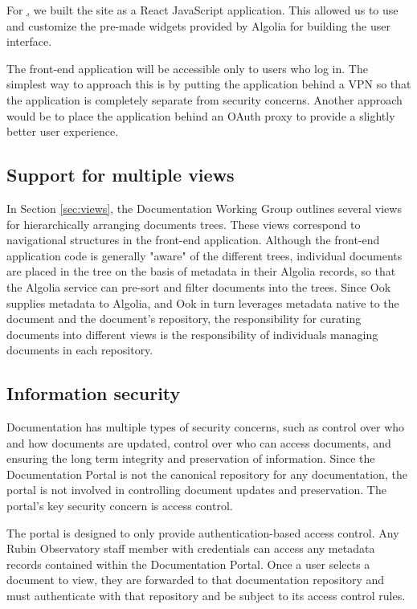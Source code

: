 For \href{www.lsst.io}, we built the site as a React JavaScript application.
This allowed us to use and customize the pre-made widgets provided by Algolia for building the user interface.

The front-end application will be accessible only to users who log in.
The simplest way to approach this is by putting the application behind a VPN so that the application is completely separate from security concerns.
Another approach would be to place the application behind an OAuth proxy to provide a slightly better user experience.

\subsection{Support for multiple views}

In Section \ref{sec:views}, the Documentation Working Group outlines several views for hierarchically arranging documents trees.
These views correspond to navigational structures in the front-end application.
Although the front-end application code is generally "aware" of the different trees, individual documents are placed in the tree on the basis of metadata in their Algolia records, so that the Algolia service can pre-sort and filter documents into the trees.
Since Ook supplies metadata to Algolia, and Ook in turn leverages metadata native to the document and the document's repository, the responsibility for curating documents into different views is the responsibility of individuals managing documents in each repository.

\subsection{Information security}

Documentation has multiple types of security concerns, such as control over who and how documents are updated, control over who can access documents, and ensuring the long term integrity and preservation of information.
Since the Documentation Portal is not the canonical repository for any documentation, the portal is not involved in controlling document updates and preservation.
The portal's key security concern is access control.

The portal is designed to only provide authentication-based access control.
Any Rubin Observatory staff member with credentials can access any metadata records contained within the Documentation Portal.
Once a user selects a document to view, they are forwarded to that documentation repository and must authenticate with that repository and be subject to its access control rules.

